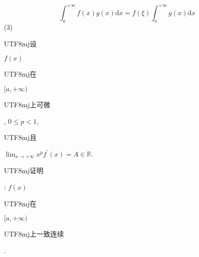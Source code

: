 \documentclass[10pt]{article}
\begin{document}
$$
\int_{a}^{+\infty} f(x) g(x) \mathrm{d} x=f(\xi) \int_{a}^{+\infty} g(x) \mathrm{d} x
$$
(3) \begin{CJK}{UTF8}{mj}设\end{CJK} $f(x)$ \begin{CJK}{UTF8}{mj}在\end{CJK} $[a,+\infty)$ \begin{CJK}{UTF8}{mj}上可微\end{CJK}, $0 \leq p<1$, \begin{CJK}{UTF8}{mj}且\end{CJK} $\lim _{x \rightarrow+\infty} x^{p} f^{\prime}(x)=A \in \mathbb{R}$. \begin{CJK}{UTF8}{mj}证明\end{CJK}: $f(x)$ \begin{CJK}{UTF8}{mj}在\end{CJK} $[a,+\infty)$ \begin{CJK}{UTF8}{mj}上一致连续\end{CJK}.
\end{document}
